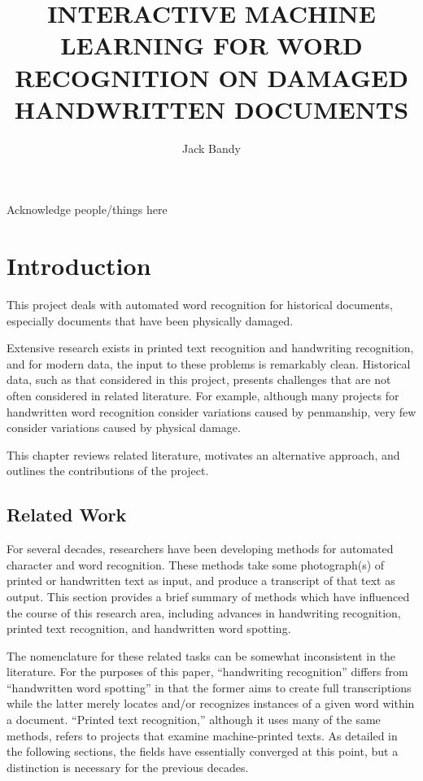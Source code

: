 \documentclass[final]{ukthesis}
\begin{document}
\author{Jack Bandy}
\title{INTERACTIVE MACHINE LEARNING FOR WORD RECOGNITION ON DAMAGED HANDWRITTEN DOCUMENTS}
\frontmatter
\maketitle
\begin{acknowledgments}
Acknowledge people/things here
\end{acknowledgments}
\tableofcontents\clearpage
\listoffigures\clearpage
\listoftables\clearpage
\mainmatter


%
%
%
\chapter{Introduction}

This project deals with automated word recognition for historical documents, especially documents that have been physically damaged.

Extensive research exists in printed text recognition and handwriting recognition, and for modern data, the input to these problems is remarkably clean. Historical data, such as that considered in this project, presents challenges that are not often considered in related literature. For example, although many projects for handwritten word recognition consider variations caused by penmanship, very few consider variations caused by physical damage.

This chapter reviews related literature, motivates an alternative approach, and outlines the contributions of the project.

%
%
\section{Related Work}
For several decades, researchers have been developing methods for automated character and word recognition. These methods take some photograph(s) of printed or handwritten text as input, and produce a transcript of that text as output. This section provides a brief summary of methods which have influenced the course of this research area, including advances in handwriting recognition, printed text recognition, and handwritten word spotting.

The nomenclature for these related tasks can be somewhat inconsistent in the literature. For the purposes of this paper, ``handwriting recognition'' differs from ``handwritten word spotting'' in that the former aims to create full transcriptions while the latter merely locates and/or recognizes instances of a given word within a document. ``Printed text recognition,'' although it uses many of the same methods, refers to projects that examine machine-printed texts. As detailed in the following sections, the fields have essentially converged at this point, but a distinction is necessary for the previous decades.
\end{document}
